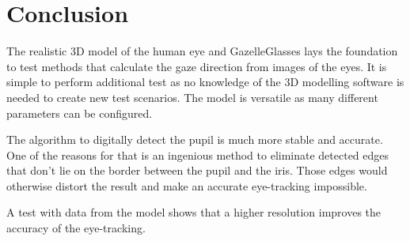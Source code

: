 \chapter{Conclusion}
\label{chap:conclusions}
The realistic 3D model of the human eye and GazelleGlasses lays the foundation to test methods that calculate the gaze direction from images of the eyes. It is simple to perform additional test as no knowledge of the 3D modelling software is needed to create new test scenarios. The model is versatile as many different parameters can be configured. 

The algorithm to digitally detect the pupil is much more stable and accurate. One of the reasons for that is an ingenious method to eliminate detected edges that don't lie on the border between the pupil and the iris. Those edges would otherwise distort the result and make an accurate eye-tracking impossible.

A test with data from the model shows that a higher resolution improves the accuracy of the eye-tracking. 
